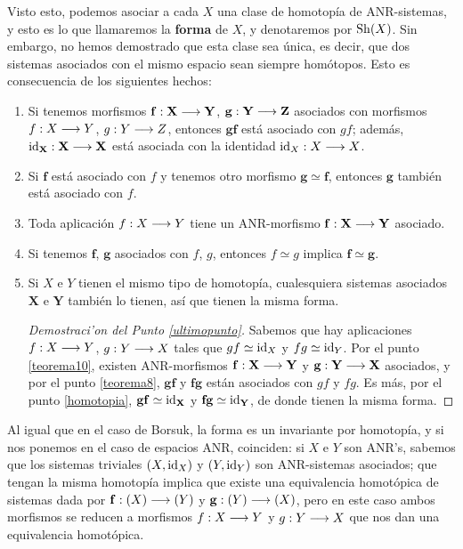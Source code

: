 Visto esto, podemos asociar a cada $ X  $ una clase de homotopía de ANR-sistemas, y esto es lo que llamaremos la \textbf{forma} de $ X  $, y denotaremos por $ \operatorname{Sh}(X)  $. Sin embargo, no hemos demostrado que esta clase sea única, es decir, que dos sistemas asociados con el mismo espacio sean siempre homótopos. Esto es consecuencia de los siguientes hechos:
\begin{enumerate}
  \item \label{teorema8} Si tenemos morfismos $ \mathbf{f}:\mathbf{X}\longrightarrow \mathbf{Y} $, $ \mathbf{g}:\mathbf{Y}\longrightarrow \mathbf{Z} $ asociados con morfismos $ f:X\longrightarrow Y  $, $ g:Y\longrightarrow Z  $, entonces $ \mathbf{g}\mathbf{f}  $ está asociado con $ gf  $; además, $ \mathbf{\operatorname{id}_X}:\mathbf{X}\longrightarrow \mathbf{X} $ está asociada con la identidad $ \operatorname{id}_X:X\longrightarrow X  $.
  \item Si $ \mathbf{f} $ está asociado con $ f  $ y tenemos otro morfismo $ \mathbf{g}\simeq \mathbf{f} $, entonces $ \mathbf{g} $ también está asociado con $ f  $.
  \item \label{teorema10} Toda aplicación $ f:X\longrightarrow Y  $ tiene un ANR-morfismo $ \mathbf{f}:\mathbf{X}\longrightarrow \mathbf{Y} $ asociado.
  \item \label{homotopia} Si tenemos $ \mathbf{f} $, $ \mathbf{g} $ asociados con $ f  $, $ g  $, entonces $ f\simeq g  $ implica $ \mathbf{f}\simeq \mathbf{g} $.
  \item \label{ultimopunto} Si $ X  $ e $ Y  $ tienen el mismo tipo de homotopía, cualesquiera sistemas asociados $ \mathbf{X} $ e $ \mathbf{Y} $ también lo tienen, así que tienen la misma forma.
  \begin{proof}[Demostraci'on del Punto \ref{ultimopunto}]
    Sabemos que hay aplicaciones $ f:X\longrightarrow Y  $, $ g:Y\longrightarrow X  $ tales que $ gf\simeq \operatorname{id}_X  $ y $ fg\simeq \operatorname{id}_Y  $. Por el punto \ref{teorema10}, existen ANR-morfismos $ \mathbf{f}:\mathbf{X}\longrightarrow \mathbf{Y} $ y $ \mathbf{g}:\mathbf{Y}\longrightarrow \mathbf{X}$ asociados, y por el punto \ref{teorema8}, $ \mathbf{g}\mathbf{f} $ y $ \mathbf{f}\mathbf{g} $ están asociados con $ gf  $ y $ fg  $. Es más, por el punto \ref{homotopia}, $ \mathbf{g}\mathbf{f}\simeq \mathbf{\operatorname{id}_{\mathbf{X}}} $ y $ \mathbf{f}\mathbf{g}\simeq \mathbf{\operatorname{id}_{\mathbf{Y}}} $, de donde tienen la misma forma.
  \end{proof}
\end{enumerate}

Al igual que en el caso de Borsuk, la forma es un invariante por homotopía, y si nos ponemos en el caso de espacios ANR, coinciden: si $ X  $ e $ Y  $ son ANR's, sabemos que los sistemas triviales $ (X,\operatorname{id}_X) $ y $ (Y,\operatorname{id}_Y ) $ son ANR-sistemas asociados; que tengan la misma homotopía implica que existe una equivalencia homotópica de sistemas dada por $ \mathbf{f}:(X)\longrightarrow (Y) $ y $ \mathbf{g}:(Y)\longrightarrow (X) $, pero en este caso ambos morfismos se reducen a morfismos $ f:X\longrightarrow Y  $ y $ g:Y\longrightarrow X  $ que nos dan una equivalencia homotópica.

